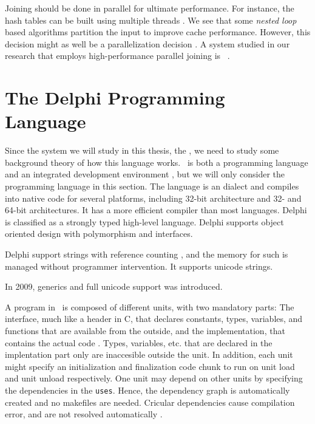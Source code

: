 Joining should be done in parallel for ultimate performance. For instance, the hash tables can be built using multiple threads \cite{Barber2014-ey}. We see that some \textit{nested loop} based algorithms partition the input to improve cache performance. However, this decision might as well be a parallelization decision \cite{Neumann2011-uq}. A system studied in our research that employs high-performance parallel joining is \ibm~\cite{Raman2013-em}.


\section{The Delphi Programming Language}
\label{sec:The Delphi Programming Language}
Since the system we will study in this thesis, the \gap, we need to study some background theory of how this language works. \delphi~is both a programming language and an integrated development environment \cite{Wikipedia_contributors2016-jk}, but we will only consider the programming language in this section. The language is an  dialect and compiles into native code for several platforms, including  32-bit architecture and  32- and 64-bit architectures. It has a more efficient compiler than most languages. Delphi is classified as a strongly typed high-level language. Delphi supports object oriented design with polymorphism and interfaces.

Delphi support strings with reference counting \cite{Wikipedia_contributors2016-jk}, and the memory for such is managed without programmer intervention. It supports unicode strings.

In 2009, generics and full unicode support was introduced.

A program in \delphi~is composed of different units, with two mandatory parts: The interface, much like a header in C, that declares constants, types, variables, and functions that are available from the outside, and the implementation, that contains the actual code \cite{noauthor_undated-pl}. Types, variables, etc. that are declared in the implentation part only are inaccesible outside the unit. In addition, each unit might specify an initialization and finalization code chunk to run on unit load and unit unload respectively. One unit may depend on other units by specifying the dependencies in the \texttt{uses}. Hence, the dependency graph is automatically created and no makefiles are needed. Cricular dependencies cause compilation error, and are not resolved automatically \cite{noauthor_undated-sp}.

